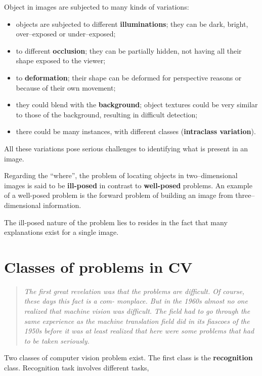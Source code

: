 \documentclass[10pt]{report}
\begin{document}
Object in images are subjected to many kinds of variations:

\begin{itemize}
\item objects are subjected to different \textbf{illuminations}; they can be dark,
bright, over--exposed or under--exposed;
\item to different \textbf{occlusion}; they can be partially hidden, not having all
their shape exposed to the viewer;
\item to \textbf{deformation}; their shape can
be deformed for perspective reasons or because of their own movement;
\item they could blend with the \textbf{background}; object textures could be very
similar to those of the background, resulting in difficult detection;
\item there could be many instances, with different classes (\textbf{intraclass
variation}).
\end{itemize}

All these variations pose serious challenges to identifying what is
present in an image.

Regarding the ``where'', the problem of locating objects in
two--dimensional images is said to be \textbf{ill-posed} in contrast to
\textbf{well-posed} problems. An example of a well-posed problem is the forward
problem of building an image from three--dimensional information.

The ill-posed nature of the problem lies to resides in the fact that
many explanations exist for a single image.

\section{Classes of problems in CV}
\label{classes-of-problems-in-cv}
\begin{quote}
\emph{The first great revelation was that the problems are difficult. Of course, these days this fact is a com- monplace. But in the 1960s almost no one realized that machine vision was difficult. The field had to go through the same experience as the machine translation field did in its fiascoes of the 1950s before it was at least realized that here were some problems that had to be taken seriously.}
\end{quote}

Two classes of computer vision problem exist. The first class is the \textbf{recognition} class. Recognition task involves different tasks,
\end{document}
